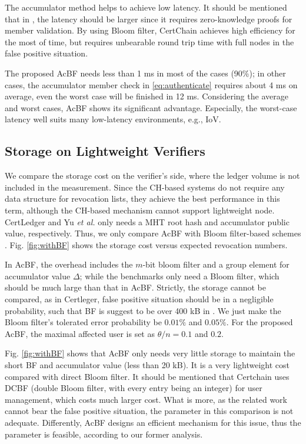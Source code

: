 \documentclass[conference]{IEEEtran}
\begin{document}
The accumulator method helps \cite{yu2019blockchain} to achieve low latency. It should be mentioned that in \cite{yu2019blockchain}, the latency should be larger since it requires zero-knowledge proofs for member validation. By using Bloom filter, CertChain \cite{chenCertchainPublicEfficient2018a} achieves high efficiency for the most of time, but requires unbearable round trip time with full nodes in the false positive situation. 

The proposed AcBF needs less than 1 ms in most of the cases (90\%); in other cases, the accumulator member check in \eqref{eq:authenticate} requires about 4 ms on average, even the worst case will be finished in 12 ms. Considering the average and worst cases, AcBF shows its significant advantage. Especially, the worst-case latency well suits many low-latency environments, e.g., IoV.

\subsection{Storage on Lightweight Verifiers}
We compare the storage cost on the verifier's side, where the ledger volume is not included in the measurement. Since the CH-based systems 
\cite{luoScalaCertScalabilityOrientedPKI2022a} do not require any data structure for revocation lists, they achieve the best performance in this term, although the CH-based mechanism cannot support lightweight node. CertLedger \cite{certledger} and Yu \textit{et al.} 
\cite{yu2019blockchain} only needs a MHT root hash and accumulator public value, respectively. Thus, we only compare AcBF with Bloom filter-based schemes \cite{certchain2018, jia2021process}. Fig. \ref{fig:withBF} shows the storage cost versus expected revocation numbers. 

In AcBF, the overhead includes the $m$-bit bloom filter and a group element for accumulator value $\Delta$; while the benchmarks only need a Bloom filter, which should be much large than that in AcBF. Strictly, the storage cannot be compared, as in Certleger, false positive situation should be in a negligible probability, such that BF is suggest to be over 400 kB in \cite{certchain2018}. We just make the Bloom filter's tolerated error probability be $0.01\%$ and $0.05\%$. For the proposed AcBF, the maximal affected user is set as $\theta/n = 0.1$ and $0.2$. 

Fig. \ref{fig:withBF} shows that AcBF only needs very little storage to maintain the short BF and accumulator value (less than 20 kB). It is a very lightweight cost compared with direct Bloom filter. It should be mentioned that Certchain uses DCBF (double Bloom filter, with every entry being an integer) for user management, which costs much larger cost. What is more, as the related work cannot bear the false positive situation, the parameter in this comparison is not adequate. Differently, AcBF designs an efficient mechanism for this issue, thus the parameter is feasible, according to our former analysis.
\end{document}
